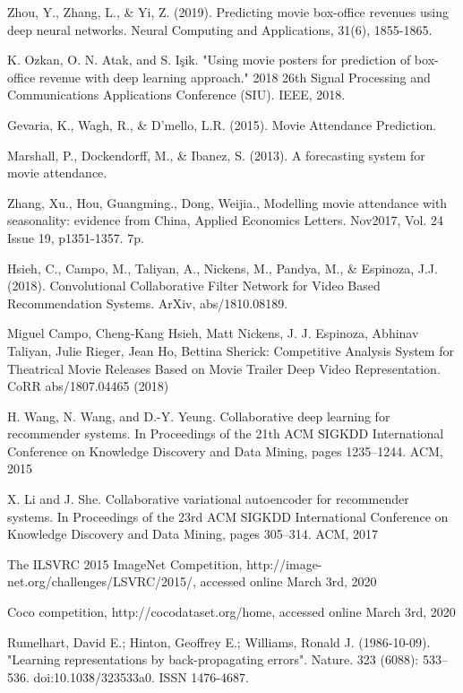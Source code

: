 {\begin{thebibliography}{25}
Zhou, Y., Zhang, L., \& Yi, Z. (2019). Predicting movie box-office revenues using deep neural networks. Neural Computing and Applications, 31(6), 1855-1865.

K. Ozkan, O. N. Atak, and S. Işik. "Using movie posters for prediction of box-office revenue with deep learning approach." 2018 26th Signal Processing and Communications Applications Conference (SIU). IEEE, 2018.

Gevaria, K., Wagh, R., \& D'mello, L.R. (2015). Movie Attendance Prediction.

Marshall, P., Dockendorff, M., \& Ibanez, S. (2013). A forecasting system for movie attendance.

Zhang, Xu., Hou, Guangming., Dong, Weijia., Modelling movie attendance with seasonality: evidence from China, Applied Economics Letters. Nov2017, Vol. 24 Issue 19, p1351-1357. 7p. 

Hsieh, C., Campo, M., Taliyan, A., Nickens, M., Pandya, M., \& Espinoza, J.J. (2018). Convolutional Collaborative Filter Network for Video Based Recommendation Systems. ArXiv, abs/1810.08189.

Miguel Campo, Cheng-Kang Hsieh, Matt Nickens, J. J. Espinoza, Abhinav Taliyan, Julie Rieger, Jean Ho, Bettina Sherick:
Competitive Analysis System for Theatrical Movie Releases Based on Movie Trailer Deep Video Representation. CoRR abs/1807.04465 (2018)

H. Wang, N. Wang, and D.-Y. Yeung. Collaborative
deep learning for recommender systems. In
Proceedings of the 21th ACM SIGKDD International
Conference on Knowledge Discovery and Data Mining,
pages 1235–1244. ACM, 2015

X. Li and J. She. Collaborative variational
autoencoder for recommender systems. In Proceedings
of the 23rd ACM SIGKDD International Conference
on Knowledge Discovery and Data Mining, pages
305–314. ACM, 2017

The ILSVRC 2015 ImageNet Competition, http://image-net.org/challenges/LSVRC/2015/, accessed online March 3rd, 2020

Coco competition, http://cocodataset.org/home, accessed online March 3rd, 2020

Rumelhart, David E.; Hinton, Geoffrey E.; Williams, Ronald J. (1986-10-09). "Learning representations by back-propagating errors". Nature. 323 (6088): 533–536. doi:10.1038/323533a0. ISSN 1476-4687.


\end{thebibliography}}
